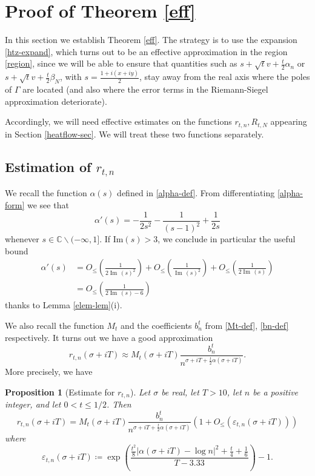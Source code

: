 \documentclass[a4paper,11pt,twoside]{amsart}
\newtheorem{proposition}[theorem]{Proposition}
\newcommand\C{\mathbb{C}}
\renewcommand\Im{{\operatorname{Im\,}}}
\newcommand\eps{\varepsilon}
\begin{document}
\section{Proof of Theorem \ref{eff}}\label{initial-sec}

In this section we establish Theorem \ref{eff}.  
The strategy is to use the expansion \eqref{htz-expand}, which turns out to be an effective approximation in the region \eqref{region}, since we will be able to ensure that quantities such as $s + \sqrt{t} v + \frac{t}{2} \alpha_n$ or $s + \sqrt{t} v + \frac{t}{2} \beta_N$, with $s = \frac{1+i(x+iy)}{2}$, stay away from the real axis where the poles of $\Gamma$ are located (and also where the error terms in the Riemann-Siegel approximation deteriorate).  

Accordingly, we will need effective estimates on the functions $r_{t,n}, R_{t,N}$ appearing in Section \ref{heatflow-sec}.  We will treat these two functions separately.

\subsection{Estimation of $r_{t,n}$}

We recall the function $\alpha(s)$ defined in \eqref{alpha-def}.  From differentiating \eqref{alpha-form} we see that
\begin{equation}\label{alpha-deriv}
 \alpha'(s) = -\frac{1}{2s^2} - \frac{1}{(s-1)^2} + \frac{1}{2 s}
\end{equation}
whenever $s \in \C \backslash (-\infty,1]$.  If $\mathrm{Im}(s) > 3$, we conclude in particular the useful bound
\begin{equation}\label{alpha-deriv-bound}
\begin{split}
 \alpha'(s) &= O_{\leq}\left( \frac{1}{2\Im(s)^2} \right) + O_{\leq}\left( \frac{1}{\Im(s)^2} \right) + O_{\leq}\left( \frac{1}{2\Im(s)} \right) \\
 &= O_{\leq}\left( \frac{1}{2 \Im(s)-6} \right)
\end{split}
\end{equation}
thanks to Lemma \ref{elem-lem}(i).  

We also recall the function $M_t$ and the coefficients $b_n^t$ from \eqref{Mt-def}, \eqref{bn-def} respectively.  It turns out we have a good approximation
$$r_{t,n}(\sigma+iT) \approx M_t(\sigma+iT) \frac{b_n^t}{n^{\sigma+iT+\frac{t}{2} \alpha(\sigma+iT)}}.$$
More precisely, we have

\begin{proposition}[Estimate for $r_{t,n}$]\label{rtn-prop}  Let $\sigma$ be real, let $T>10$, let $n$ be a positive integer, and let $0 < t \leq 1/2$.  Then 
$$ r_{t,n}(\sigma+iT) = M_t(\sigma+iT) \frac{b_n^t}{n^{\sigma+iT+\frac{t}{2} \alpha(\sigma+iT)}} \left(1 + O_{\leq}(\eps_{t,n}(\sigma+iT))\right)$$
where 
\begin{equation}\label{eps-def}
 \eps_{t,n}(\sigma+iT) \coloneqq \exp\left( \frac{\frac{t^2}{8} |\alpha(\sigma+iT) - \log n|^2 + \frac{t}{4} + \frac{1}{6}}{T-3.33} \right)-1.
\end{equation}
\end{proposition}
\end{document}
